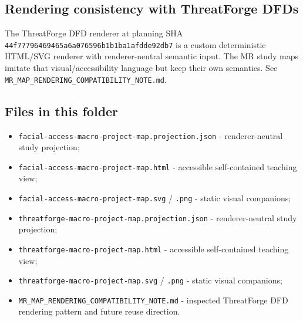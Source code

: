 \documentclass[
  10pt,
]{article}
\providecommand{\tightlist}{%
  \setlength{\itemsep}{0pt}\setlength{\parskip}{0pt}}
\begin{document}
\subsection{Rendering consistency with ThreatForge
DFDs}\label{rendering-consistency-with-threatforge-dfds}

The ThreatForge DFD renderer at planning SHA
\texttt{44f77796469465a6a076596b1b1ba1afdde92db7} is a custom
deterministic HTML/SVG renderer with renderer-neutral semantic input.
The MR study maps imitate that visual/accessibility language but keep
their own semantics. See
\texttt{MR\_MAP\_RENDERING\_COMPATIBILITY\_NOTE.md}.

\subsection{Files in this folder}\label{files-in-this-folder}

\begin{itemize}
\tightlist
\item
  \texttt{facial-access-macro-project-map.projection.json} -
  renderer-neutral study projection;
\item
  \texttt{facial-access-macro-project-map.html} - accessible
  self-contained teaching view;
\item
  \texttt{facial-access-macro-project-map.svg} / \texttt{.png} - static
  visual companions;
\item
  \texttt{threatforge-macro-project-map.projection.json} -
  renderer-neutral study projection;
\item
  \texttt{threatforge-macro-project-map.html} - accessible
  self-contained teaching view;
\item
  \texttt{threatforge-macro-project-map.svg} / \texttt{.png} - static
  visual companions;
\item
  \texttt{MR\_MAP\_RENDERING\_COMPATIBILITY\_NOTE.md} - inspected
  ThreatForge DFD rendering pattern and future reuse direction.
\end{itemize}
\end{document}
